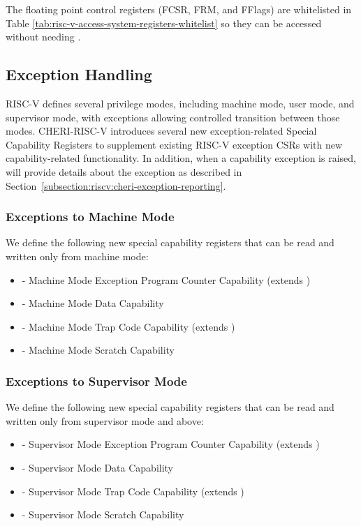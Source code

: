 The floating point control
registers (FCSR, FRM, and FFlags) are whitelisted in Table \ref{tab:risc-v-access-system-registers-whitelist}
so they can be accessed without needing \cappermASR{}.

\subsection{Exception Handling}
\label{subsection:riscv:exceptionhandling}
RISC-V defines several privilege modes, including machine mode, user mode, and
supervisor mode, with exceptions allowing controlled transition between those modes.
CHERI-RISC-V introduces several new exception-related Special Capability Registers
to supplement existing RISC-V exception CSRs with new capability-related functionality.
In addition, when a capability exception is raised, \xtval{} will provide
details about the exception as described in Section~\ref{subsection:riscv:cheri-exception-reporting}.

\subsubsection{Exceptions to Machine Mode}
We define the following new special capability registers that can be read and
written only from machine mode:

\begin{itemize}
\item \MEPCC{} - Machine Mode Exception Program Counter Capability (extends
  \mepc{})
\item \MTDC{} - Machine Mode Data Capability
\item \MTCC{} - Machine Mode Trap Code Capability (extends \mtvec{})
\item \MScratchC{} - Machine Mode Scratch Capability
\end{itemize}

\subsubsection{Exceptions to Supervisor Mode}

We define the following new special capability registers that can be read and
written only from supervisor mode and above:

\begin{itemize}
\item \SEPCC{} - Supervisor Mode Exception Program Counter Capability (extends
  \sepc{})
\item \STDC{} - Supervisor Mode Data Capability
\item \STCC{} - Supervisor Mode Trap Code Capability (extends
  \stvec{})
\item \SScratchC{} - Supervisor Mode Scratch Capability
\end{itemize}

